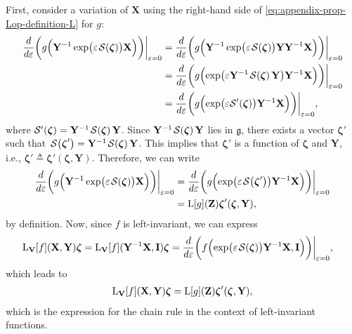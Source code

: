 First, consider a variation of $\mathbf{X}$ using the right-hand side of \eqref{eq:appendix-prop-Lop-definition-L} for $g$:
\begin{align}
    \frac{d}{d\varepsilon}\biggl(g\Bigl(\mathbf{Y}^{-1}\exp\bigl(\varepsilon\SL[\boldsymbol{\zeta}]\bigr)\mathbf{X}\Bigr)\biggr)\biggr|_{\varepsilon=0} &= \frac{d}{d\varepsilon}\biggl(g\Bigl(\mathbf{Y}^{-1}\exp\bigl(\varepsilon\SL[\boldsymbol{\zeta}]\bigr)\mathbf{Y}\mathbf{Y}^{-1}\mathbf{X}\Bigr)\biggr)\biggr|_{\varepsilon=0}\\
    &= \frac{d}{d\varepsilon}\biggl(g\Bigl(\exp\bigl(\varepsilon\mathbf{Y}^{-1}\SL[\boldsymbol{\zeta}]\mathbf{Y}\bigr)\mathbf{Y}^{-1}\mathbf{X}\Bigr)\biggr)\biggr|_{\varepsilon=0} \\
    &= \frac{d}{d\varepsilon}\biggl(g\Bigl(\exp\bigl(\varepsilon\mathcal{S}'(\boldsymbol{\zeta})\bigr)\mathbf{Y}^{-1}\mathbf{X}\Bigr)\biggr)\biggr|_{\varepsilon=0},
\end{align}
where $\mathcal{S}'(\boldsymbol{\zeta}) = \mathbf{Y}^{-1}\SL[\boldsymbol{\zeta}]\mathbf{Y}$. Since $\mathbf{Y}^{-1}\SL[\boldsymbol{\zeta}]\mathbf{Y}$ lies in $\mathfrak{g}$, there exists a vector $\boldsymbol{\zeta}'$ such that $\SL[\boldsymbol{\zeta}'] = \mathbf{Y}^{-1}\SL[\boldsymbol{\zeta}]\mathbf{Y}$. This implies that $\boldsymbol{\zeta}'$ is a function of $\boldsymbol{\zeta}$ and $\mathbf{Y}$, i.e., $\boldsymbol{\zeta}' \triangleq \boldsymbol{\zeta}'(\boldsymbol{\zeta}, \mathbf{Y})$. Therefore, we can write
\begin{align}
    \frac{d}{d\varepsilon}\biggl(g\Bigl(\mathbf{Y}^{-1}\exp\bigl(\varepsilon\SL[\boldsymbol{\zeta}]\bigr)\mathbf{X}\Bigr)\biggr)\biggr|_{\varepsilon=0} &= \frac{d}{d\varepsilon}\biggl(g\Bigl(\exp\bigl(\varepsilon\SL[\boldsymbol{\zeta}']\bigr)\mathbf{Y}^{-1}\mathbf{X}\Bigr)\biggr)\biggr|_{\varepsilon=0}\\
    &= \Lop[g](\mathbf{Z})\boldsymbol{\zeta}'(\boldsymbol{\zeta}, \mathbf{Y}) \label{appendix-prop-Lop-chain-rule-LgZ-zeta-prime},
\end{align}
by definition. Now, since $f$ is left-invariant, we can express
\begin{align}
    \Lop_\mathbf{V}[f](\mathbf{X}, \mathbf{Y})\boldsymbol{\zeta} &= 
    \Lop_\mathbf{V}[f](\mathbf{Y}^{-1}\mathbf{X}, \mathbf{I})\boldsymbol{\zeta}
    = \frac{d}{d\varepsilon}\biggl(f\Bigl(\exp\bigl(\varepsilon\SL[\boldsymbol{\zeta}]\bigr)\mathbf{Y}^{-1}\mathbf{X}, \mathbf{I}\Bigr)\biggr)\biggr|_{\varepsilon=0},
\end{align}
which leads to
\begin{align}
    \operatorname{L}_\mathbf{V}[f](\mathbf{X}, \mathbf{Y})\boldsymbol{\zeta} = \operatorname{L}[g](\mathbf{Z})\boldsymbol{\zeta}'(\boldsymbol{\zeta}, \mathbf{Y}) \label{app:prop-Lop-chain-rule-LVf-final-form},
\end{align}
which is the expression for the chain rule in the context of left-invariant functions.
